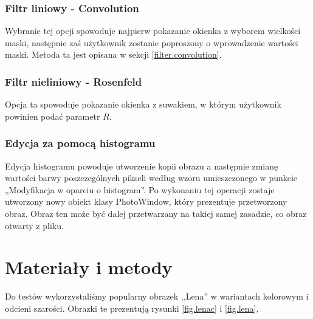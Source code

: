 \documentclass{classrep}
\begin{document}
\subsubsection{Filtr liniowy - Convolution}
Wybranie tej opcji spowoduje najpierw pokazanie okienka z wyborem wielkości maski, następnie zaś użytkownik zostanie poproszony o wprowadzenie wartości maski. Metoda ta jest opisana w sekcji \ref{filter.convolution}.

\subsubsection{Filtr nieliniowy - Rosenfeld}
Opcja ta spowoduje pokazanie okienka z suwakiem, w którym użytkownik powinien podać parametr $R$.

\subsubsection{Edycja za pomocą histogramu}
Edycja histogramu powoduje utworzenie kopii obrazu a następnie zmianę wartości barwy poszczególnych pikseli według wzoru umieszczonego w punkcie „Modyfikacja w oparciu o histogram”. Po wykonaniu tej operacji zostaje utworzony nowy obiekt klasy PhotoWindow, który prezentuje przetworzony obraz. Obraz  ten może być dalej przetwarzany na takiej samej zasadzie, co obraz otwarty z pliku.

\section{Materiały i metody}
Do testów wykorzystaliśmy popularny obrazek ,,Lena'' w wariantach kolorowym i odcieni szarości. Obrazki te prezentują rysunki \ref{fig.lenac} i \ref{fig.lena}.
\end{document}
